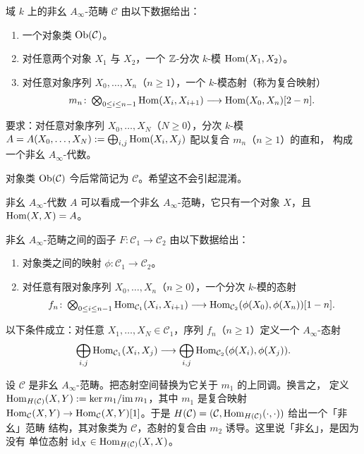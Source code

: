 \begin{dfn}
域 $k$ 上的非幺 $A_\infty$-范畴 $\mathcal{C}$ 由以下数据给出：
\begin{enumerate}[label=\arabic*),leftmargin=2.2em,itemsep=1pt,topsep=2pt]
\item 一个对象类 $\operatorname{Ob}(\mathcal{C})$。
\item 对任意两个对象 $X_1$ 与 $X_2$，一个 $\mathbb{Z}$-分次 $k$-模 $\operatorname{Hom}(X_1,X_2)$。
\item 对任意对象序列 $X_0,\dots,X_n$（$n\ge1$），一个 $k$-模态射（称为复合映射）
  \[
  \textstyle m_n\colon\bigotimes_{0\le i\le n-1}\operatorname{Hom}(X_i,X_{i+1})
  \longrightarrow\operatorname{Hom}(X_0,X_n)[2-n].
  \]
\end{enumerate}
要求：对任意对象序列 $X_0,\dots,X_N$（$N\ge0$），分次 $k$-模
$A=A(X_0,\dots,X_N):=\bigoplus_{i,j}\operatorname{Hom}(X_i,X_j)$ 配以复合 $m_n$（$n\ge1$）的直和，
构成一个非幺 $A_\infty$-代数。
\end{dfn}

对象类 $\operatorname{Ob}(\mathcal{C})$ 今后常简记为 $\mathcal{C}$。希望这不会引起混淆。

\begin{rmk}
非幺 $A_\infty$-代数 $A$ 可以看成一个非幺 $A_\infty$-范畴，它只有一个对象 $X$，且
$\operatorname{Hom}(X,X)=A$。
\end{rmk}

\begin{dfn}
非幺 $A_\infty$-范畴之间的函子 $F\colon\mathcal{C}_1\to\mathcal{C}_2$ 由以下数据给出：
\begin{enumerate}[label=\arabic*),leftmargin=2.2em,itemsep=1pt,topsep=2pt]
\item 对象类之间的映射 $\phi\colon\mathcal{C}_1\to\mathcal{C}_2$。
\item 对任意有限对象序列 $X_0,\dots,X_n$（$n\ge0$），一个分次 $k$-模的态射
  \[
  \textstyle f_n\colon\bigotimes_{0\le i\le n-1}\operatorname{Hom}_{\mathcal{C}_1}(X_i,X_{i+1})
  \longrightarrow\operatorname{Hom}_{\mathcal{C}_2}(\phi(X_0),\phi(X_n))[1-n].
  \]
\end{enumerate}
以下条件成立：对任意 $X_1,\dots,X_N\in\mathcal{C}_1$，序列 $f_n$（$n\ge1$）定义一个
$A_\infty$-态射
\[
\bigoplus_{i,j}\operatorname{Hom}_{\mathcal{C}_1}(X_i,X_j)\longrightarrow
\bigoplus_{i,j}\operatorname{Hom}_{\mathcal{C}_2}(\phi(X_i),\phi(X_j)).
\]
\end{dfn}

\begin{rmk}
设 $\mathcal{C}$ 是非幺 $A_\infty$-范畴。把态射空间替换为它关于 $m_1$ 的上同调。换言之，
定义 $\operatorname{Hom}_{H(\mathcal{C})}(X,Y):={\ker m_1}/{\operatorname{im} m_1}$，其中 $m_1$ 是复合映射
$\operatorname{Hom}_{\mathcal{C}}(X,Y)\to\operatorname{Hom}_{\mathcal{C}}(X,Y)[1]$。于是
$H(\mathcal{C})=(\mathcal{C},\operatorname{Hom}_{H(\mathcal{C})}(\cdot,\cdot))$ 给出一个「非幺」范畴
结构，其对象类为 $\mathcal{C}$，态射的复合由 $m_2$ 诱导。这里说「非幺」，是因为没有
单位态射 $\mathrm{id}_X\in\operatorname{Hom}_{H(\mathcal{C})}(X,X)$。
\end{rmk}

